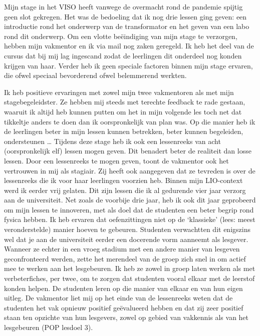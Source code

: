 \documentclass[a4paper,12pt,twoside]{article}%
\begin{document}
Mijn stage in het VISO heeft vanwege de overmacht rond de pandemie spijtig geen slot gekregen. Het was de bedoeling dat ik nog drie lessen ging geven: een introductie rond het onderwerp van de transformator en het geven van een labo rond dit onderwerp. Om een vlotte beëindiging van mijn stage te verzorgen, hebben mijn vakmentor en ik via mail nog zaken geregeld. Ik heb het deel van de cursus dat bij mij lag ingescand zodat de leerlingen dit onderdeel nog konden krijgen van haar. Verder heb ik geen speciale factoren binnen mijn stage ervaren, die ofwel speciaal bevorderend ofwel belemmerend werkten.\newline

Ik heb positieve ervaringen met zowel mijn twee vakmentoren als met mijn stagebegeleidster. Ze hebben mij steeds met terechte feedback te rade gestaan, waaruit ik altijd heb kunnen putten om het in mijn volgende les toch net dat tikkeltje anders te doen dan ik oorspronkelijk van plan was. Op die manier heb ik de leerlingen beter in mijn lessen kunnen betrekken, beter kunnen begeleiden, ondersteunen \ldots{}  Tijdens deze stage heb ik ook een lessenreeks van acht (oorspronkelijk elf) lessen mogen geven. Dit benadert beter de realiteit dan losse lessen. Door een lessenreeks te mogen geven, toont de vakmentor ook het vertrouwen in mij als stagiair. Zij heeft ook aangegeven dat ze tevreden is over de lessenreeks die ik voor haar leerlingen voorzien heb.\newline
Binnen mijn LIO-context werd ik eerder vrij gelaten. Dit zijn lessen die ik al gedurende vier jaar verzorg aan de universiteit. Net zoals de voorbije drie jaar, heb ik ook dit jaar geprobeerd om mijn lessen te innoveren, met als doel dat de studenten een beter begrip rond fysica hebben. Ik heb ervaren dat oefenzittingen niet op de `klassieke' (lees: meest veronderstelde) manier hoeven te gebeuren. Studenten verwachtten dit enigszins wel dat je aan de universiteit eerder een docerende vorm aanneemt als lesgever. Wanneer ze echter in een vroeg stadium met een andere manier van lesgeven geconfronteerd werden, zette het merendeel van de groep zich snel in om actief mee te werken aan het lesgebeuren. Ik heb ze zowel in groep laten werken als met verbeterfiches, per twee, om te zorgen dat studenten vooral elkaar met de leerstof konden helpen. De studenten leren op die manier van elkaar en van hun eigen uitleg. De vakmentor liet mij op het einde van de lessenreeks weten dat de studenten het vak opnieuw positief geëvalueerd hebben en dat zij zeer positief staan ten opzichte van hun lesgevers, zowel op gebied van vakkennis als van het lesgebeuren (POP lesdoel 3). \newline\newline
\end{document}
